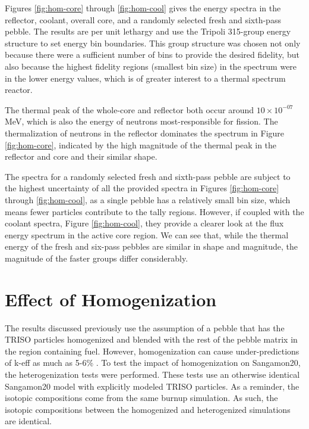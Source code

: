 Figures \ref{fig:hom-core} through \ref{fig:hom-cool} gives the energy spectra in the reflector, coolant, overall core, and a randomly selected fresh and sixth-pass pebble.  The results are per unit lethargy and use the Tripoli 315-group energy structure \cite{noauthor_tripoli_nodate} to set energy bin boundaries.  This group structure was chosen not only because there were a sufficient number of bins to provide the desired fidelity, but also because the highest fidelity regions (smallest bin size) in the spectrum were in the lower energy values, which is of greater interest to a thermal spectrum reactor.



The thermal peak of the whole-core and reflector both occur around $10\times10^{-07}$ MeV, which is also the energy of neutrons most-responsible for fission.  The thermalization of neutrons in the reflector dominates the spectrum in Figure \ref{fig:hom-core}, indicated by the high magnitude of the thermal peak in the reflector and core and their similar shape.



The spectra for a randomly selected fresh and sixth-pass pebble are subject to the highest uncertainty of all the provided spectra in Figures \ref{fig:hom-core} through \ref{fig:hom-cool}, as a single pebble has a relatively small bin size, which means fewer particles contribute to the tally regions.  However, if coupled with the coolant spectra, Figure \ref{fig:hom-cool}, they provide a clearer look at the flux energy spectrum in the active core region.  We can see that, while the thermal energy of the fresh and six-pass pebbles are similar in shape and magnitude, the magnitude of the faster groups differ considerably.


\section{Effect of Homogenization}
\label{res-hom}

The results discussed previously use the assumption of a pebble that has the TRISO particles homogenized and blended with the rest of the pebble matrix in the region containing fuel.  However, homogenization can cause under-predictions of k-eff as much as 5-6\% \cite{brown_stochastic_2005}.  To test the impact of homogenization on Sangamon20, the heterogenization tests were performed.  These tests use an otherwise identical Sangamon20 model with explicitly modeled TRISO particles.  As a reminder, the isotopic compositions come from the same burnup simulation.  As such, the isotopic compositions between the homogenized and heterogenized simulations are identical.


